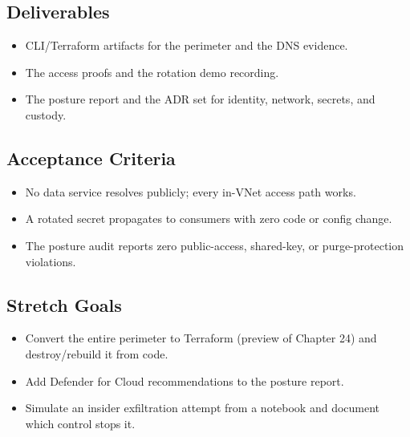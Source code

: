 \subsection*{Deliverables}
\begin{itemize}
    \item CLI/Terraform artifacts for the perimeter and the DNS evidence.
    \item The access proofs and the rotation demo recording.
    \item The posture report and the ADR set for identity, network, secrets, and custody.
\end{itemize}

\subsection*{Acceptance Criteria}
\begin{itemize}
    \item No data service resolves publicly; every in-VNet access path works.
    \item A rotated secret propagates to consumers with zero code or config change.
    \item The posture audit reports zero public-access, shared-key, or purge-protection violations.
\end{itemize}

\subsection*{Stretch Goals}
\begin{itemize}
    \item Convert the entire perimeter to Terraform (preview of Chapter 24) and destroy/rebuild it from code.
    \item Add Defender for Cloud recommendations to the posture report.
    \item Simulate an insider exfiltration attempt from a notebook and document which control stops it.
\end{itemize}

